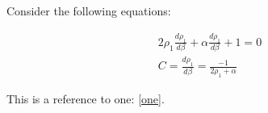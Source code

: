 \documentclass{article}
\begin{document}
Consider the following equations:

    \begin{align}
        \label{one} 2\rho_{1}\frac{d\rho_{1}}{d\beta} + \alpha\frac{d\rho_{1}}{d\beta} + 1 = 0 \\
        C = \frac{d\rho_{1}}{d\beta} = \frac{-1}{2\rho_{1}+\alpha}
    \end{align}

\pagebreak

This is a reference to one: \ref{one}.
\end{document}
